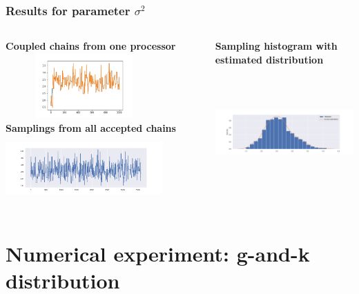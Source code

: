 \documentclass{beamer}
\begin{document}
\begin{frame}
	\frametitle{Results for parameter $\sigma^2$}
	\begin{columns}
		\begin{column}{0.4\textwidth}
			{\scriptsize \textbf{Coupled chains from one processor}}\\
			\includegraphics[width=6cm,height=2.5cm]{doublecoupling_chainmeeting/doublecoupling_sigma_chain_meeting}
			\vspace{0.2cm}
			{	\scriptsize \textbf{Samplings from all accepted chains }}\\
			\includegraphics[width=6cm,height=2.5cm]{doublecoupling_pack/doublecoupling_sampling_sigma}
		\end{column}
		\begin{column}{0.4\textwidth}
			{\scriptsize \textbf{Sampling histogram with estimated distribution}}\\
			\includegraphics[width=6cm,height=5cm]{doublecoupling_pack/doublecoupling_sigma_histogram_kernel}
		\end{column}
	\end{columns}
	
	
\end{frame}

	
\section{Numerical experiment: g-and-k distribution}
\end{document}
